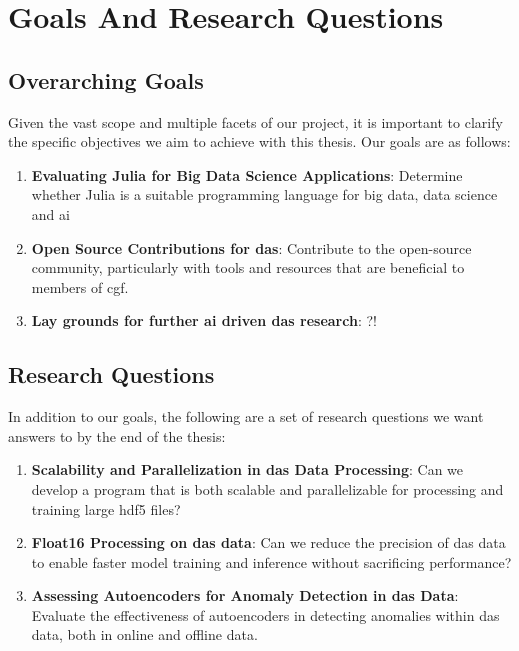 \section{Goals And Research Questions}

\subsection{Overarching Goals}

Given the vast scope and multiple facets of our project, it is important to clarify the specific objectives we aim to achieve with this thesis. Our goals are as follows:

\begin{enumerate}
    \item \textbf{Evaluating Julia for Big Data Science Applications}: Determine whether Julia is a suitable programming language for big data, data science and \acrshort{ai}
    \item \textbf{Open Source Contributions for \acrshort{das}}: Contribute to the open-source community, particularly with tools and resources that are beneficial to members of \acrshort{cgf}.
    \item \textbf{Lay grounds for further \acrshort{ai} driven \acrfull{das} research}: ?!
\end{enumerate}


\subsection{Research Questions}

In addition to our goals, the following are a set of research questions we want answers to by the end of the thesis:

\begin{enumerate}
    \item \textbf{Scalability and Parallelization in \acrshort{das} Data Processing}: Can we develop a program that is both scalable and parallelizable for processing and training large \acrshort{hdf5} files?
    \item \textbf{Float16 Processing on \acrshort{das} data}: Can we reduce the precision of \acrshort{das} data to enable faster model training and inference without sacrificing performance?
    \item \textbf{Assessing Autoencoders for Anomaly Detection in \acrshort{das} Data}: Evaluate the effectiveness of autoencoders in detecting anomalies within \acrshort{das} data, both in online and offline data.
\end{enumerate}
